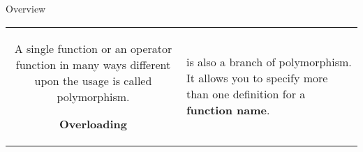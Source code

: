 \documentclass[../lecture5-objectorientation.tex]{subfiles}
\begin{document}
\begin{frame}[fragile]{Overview}
\begin{table}[h]
\begin{tabularx}{\textwidth}{c X}
{                A single function or an operator function in many ways different upon the usage is called polymorphism.
            }

            \textbf{Overloading} & is also a branch of polymorphism. It allows you to specify more than one definition for a \textbf{function name}. \\
        \end{tabularx}
    \end{table}
\end{frame}

\end{document}
